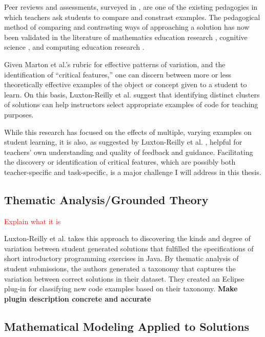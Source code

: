 \documentclass[12pt]{article}
\begin{document}
Peer reviews and assessments, surveyed in \cite{peerReview98}, are one of the existing pedagogies in which teachers ask students to compare and constrast examples. The pedagogical method of comparing and contrasting ways of approaching a solution has now been validated in the literature of mathematics education research \cite{Star07}, cognitive science \cite{loewenstein2003analogical,kurtz01learning,telling}, and computing education research \cite{Suhonen08, PatitsasICER13}.

Given Marton et al.'s rubric for effective patterns of variation, and the identification of ``critical features,'' one can discern between more or less theoretically effective examples of the object or concept given to a student to learn. On this basis, Luxton-Reilly et al. \cite{Luxton13} suggest that identifying distinct clusters of solutions can help instructors select appropriate examples of code for teaching purposes. 

While this research has focused on the effects of multiple, varying examples on student learning, it is also, as suggested by Luxton-Reilly et al. \cite{Luxton13}, helpful for teachers' own understanding and quality of feedback and guidance. Facilitating the discovery or identification of critical features, which are possibly both teacher-specific and task-specific, is a major challenge I will address in this thesis.

\subsection{Thematic Analysis/Grounded Theory}

\textcolor{red}{Explain what it is}

Luxton-Reilly et al. \cite{Luxton13} takes this approach to discovering the kinds and degree of variation between student generated solutions that fulfilled the specifications of short introductory programming exercises in Java . By thematic analysis \cite{thematic06} of student submissions, the authors generated a taxonomy that captures the variation between correct solutions in their dataset. They created an Eclipse plug-in for classifying new code examples based on their taxonomy. \textbf{Make plugin description concrete and accurate}

\subsection{Mathematical Modeling Applied to Solutions}
\end{document}
